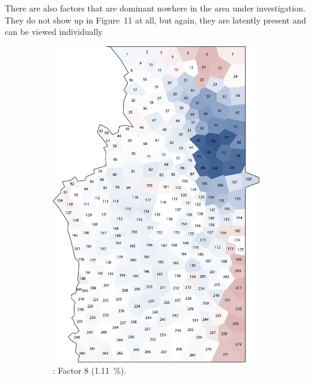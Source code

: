 \documentclass[output=paper]{LSP/langsci}
\begin{document}
There are also factors that are dominant nowhere in the area under investigation. They do not show up in Figure~11 at all, but again, they are latently present and can be viewed individually 

\begin{figure}
\centering
\begin{subfigure}[t]{0.3\textwidth}
\includegraphics[width=\textwidth]{illustrations/pickl_fig12}
\caption{: Factor 8 (1.11~\%).}
\label{fig:12}
\end{subfigure}   
~
\begin{subfigure}[t]{0.3\textwidth}

\end{subfigure}
\end{figure}
\end{document}
